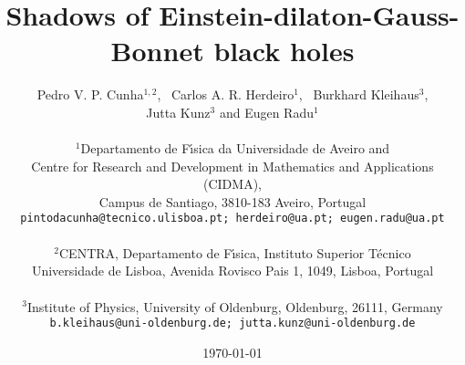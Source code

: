 \documentclass[12pt]{article}
\date{\today}
\begin{document}
\title{\Large{\bf Shadows of Einstein-dilaton-Gauss-Bonnet black holes%
} }

%
 \author{
{\large Pedro V. P. Cunha}$^{1,2}$, \
{\large Carlos A. R. Herdeiro}$^{1}$, \
{\large Burkhard Kleihaus}$^{3}$, \\
{\large Jutta Kunz}$^{3}$ and
{\large Eugen Radu}$^{1}$
\\
\\
$^{1}${\small Departamento de F\'\i sica da Universidade de Aveiro and  } \\ {\small  Centre for Research and Development  in Mathematics and Applications (CIDMA),
 } \\ {\small    Campus de Santiago, 3810-183 Aveiro, Portugal}
 \\ \texttt{\small  pintodacunha@tecnico.ulisboa.pt; herdeiro@ua.pt; eugen.radu@ua.pt}
 \\
 \\
$^{2}${\small CENTRA, Departamento de F\'\i sica, Instituto Superior T\'ecnico} \\ {\small Universidade de Lisboa, Avenida Rovisco Pais 1, 1049, Lisboa, Portugal}
 \\
 \\
$^{3}${\small Institute of Physics, University of Oldenburg, Oldenburg, 26111, Germany}
 \\ \texttt{\small  b.kleihaus@uni-oldenburg.de; jutta.kunz@uni-oldenburg.de}
}
\maketitle

 
\end{document}
